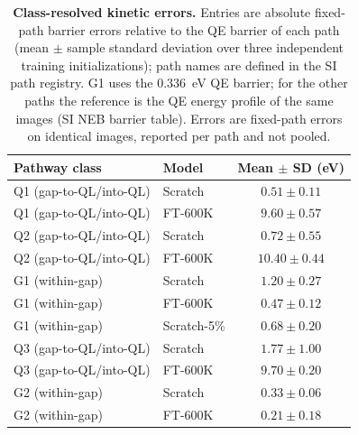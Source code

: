 \begin{table}[htbp]
\centering
\small
\caption{\textbf{Class-resolved kinetic errors.} Entries are absolute fixed-path barrier errors relative to the QE barrier of each path (mean $\pm$ sample standard deviation over three independent training initializations); path names are defined in the SI path registry. G1 uses the 0.336~eV QE barrier; for the other paths the reference is the QE energy profile of the same images (SI NEB barrier table). Errors are fixed-path errors on identical images, reported per path and not pooled.}
\label{tab:a3_strict_path_errors}
\begin{tabular}{llc}
\toprule
Pathway class & Model & Mean $\pm$ SD (eV) \\
\midrule
Q1 (gap-to-QL/into-QL) & Scratch & $0.51 \pm 0.11$ \\
Q1 (gap-to-QL/into-QL) & FT-600K & $9.60 \pm 0.57$ \\
Q2 (gap-to-QL/into-QL) & Scratch & $0.72 \pm 0.55$ \\
Q2 (gap-to-QL/into-QL) & FT-600K & $10.40 \pm 0.44$ \\
G1 (within-gap) & Scratch & $1.20 \pm 0.27$ \\
G1 (within-gap) & FT-600K & $0.47 \pm 0.12$ \\
G1 (within-gap) & Scratch-5\% & $0.68 \pm 0.20$ \\
Q3 (gap-to-QL/into-QL) & Scratch & $1.77 \pm 1.00$ \\
Q3 (gap-to-QL/into-QL) & FT-600K & $9.70 \pm 0.20$ \\
G2 (within-gap) & Scratch & $0.33 \pm 0.06$ \\
G2 (within-gap) & FT-600K & $0.21 \pm 0.18$ \\
\bottomrule
\end{tabular}
\end{table}
